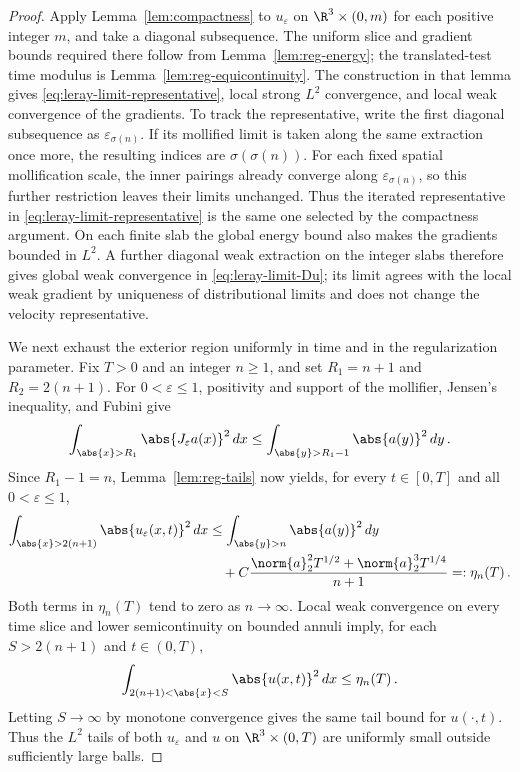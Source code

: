 \documentclass[11pt,reqno]{amsart}
\begin{document}
\begin{proof}
Apply Lemma~\ref{lem:compactness} to $u_{\varepsilon}$ on
$\R^3\times(0,m)$ for each positive integer $m$, and take a diagonal
subsequence. The uniform slice and gradient bounds required there follow
from Lemma~\ref{lem:reg-energy}; the translated-test time modulus is
Lemma~\ref{lem:reg-equicontinuity}. The construction in that lemma gives
\eqref{eq:leray-limit-representative}, local strong $L^2$ convergence, and
local weak convergence of the gradients. To track the representative, write
the first diagonal subsequence as $\varepsilon_{\sigma(n)}$. If its mollified
limit is taken along the same extraction once more, the resulting indices are
$\sigma(\sigma(n))$. For each fixed spatial mollification scale, the inner
pairings already converge along $\varepsilon_{\sigma(n)}$, so this further
restriction leaves their limits unchanged. Thus the iterated representative
in \eqref{eq:leray-limit-representative} is the same one selected by the
compactness argument. On each finite slab the global energy bound also makes
the gradients bounded in $L^2$. A further diagonal weak extraction on the
integer slabs therefore gives global weak convergence in
\eqref{eq:leray-limit-Du}; its limit agrees with the local weak gradient by
uniqueness of distributional limits and does not change the velocity
representative.

We next exhaust the exterior region uniformly in time and in the
regularization parameter. Fix $T>0$ and an integer $n\ge1$, and set
$R_1=n+1$ and $R_2=2(n+1)$. For $0<\varepsilon\le1$, positivity and support
of the mollifier, Jensen's inequality, and Fubini give
\begin{equation}\label{eq:leray-initial-tail}
 \int_{\abs{x}>R_1}\abs{J_\varepsilon a(x)}^2\,dx
 \le \int_{\abs{y}>R_1-1}\abs{a(y)}^2\,dy\,.
\end{equation}
Since $R_1-1=n$, Lemma~\ref{lem:reg-tails} now yields, for every $t\in[0,T]$ and all $0<\varepsilon\le1$,
\begin{equation}\label{eq:leray-uniform-tail}
\begin{aligned}
 \int_{\abs{x}>2(n+1)}\abs{u_\varepsilon(x,t)}^2\,dx
 &\le \int_{\abs{y}>n}\abs{a(y)}^2\,dy\\
 &\quad+C\frac{\norm{a}_2^2T^{1/2}+\norm{a}_2^3T^{1/4}}{n+1}
 =:\eta_n(T)\,.
\end{aligned}
\end{equation}
Both terms in $\eta_n(T)$ tend to zero as $n\to\infty$. Local weak convergence
on every time slice and lower semicontinuity on bounded annuli imply, for each
$S>2(n+1)$ and $t\in(0,T)$,
\begin{equation*}
 \int_{2(n+1)<\abs{x}<S}\abs{u(x,t)}^2\,dx\le\eta_n(T)\,.
\end{equation*}
Letting $S\to\infty$ by monotone convergence gives the same tail bound for
$u(\cdot,t)$. Thus the $L^2$ tails of both $u_\varepsilon$ and $u$ on
$\R^3\times(0,T)$ are uniformly small outside sufficiently large balls.


\end{proof}
\end{document}
